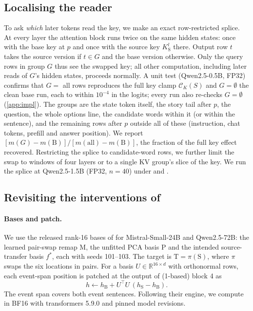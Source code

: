 \subsection{Localising the reader}\label{sec:method-splice}

To ask \emph{which} later tokens read the key, we make an exact row-restricted splice. At every layer the attention block runs twice on the same hidden states: once with the base key at $p$ and once with the source key $K_{\mathrm{S}}^l$ there. Output row $t$ takes the source version if $t \in G$ and the base version otherwise. Only the query rows in group $G$ thus see the swapped key; all other computation, including later reads of $G$'s hidden states, proceeds normally.
A unit test (Qwen2.5-0.5B, FP32) confirms that $G = $ all rows reproduces the full key clamp $\mathcal{C}_K(S)$ and $G = \emptyset$ the clean base run, each to within $10^{-4}$ in the logits; every run also re-checks $G = \emptyset$ (\cref{app:impl}).
The groups are the state token itself, the story tail after $p$, the question, the whole options line, the candidate words within it (or within the \fmtPost{} sentence), and the remaining rows after $p$ outside all of these (instruction, chat tokens, prefill and answer position). We report $[m(G) - m(\mathrm{B})]/[m(\text{all}) - m(\mathrm{B})]$, the fraction of the full key effect recovered. Restricting the splice to candidate-word rows, we further limit the swap to windows of four layers or to a single KV group's slice of the key.
We run the splice at Qwen2.5-1.5B (FP32, $n = 40$) under \fmtOpt{} and \fmtLetter{}. 

\subsection{Revisiting the interventions of \citet{anonymous2026fitted}}\label{sec:method-paper1}

\paragraph{Bases and patch.} We use the released rank-16 bases of \citet{anonymous2026fitted} for Mistral-Small-24B and Qwen2.5-72B: the learned pair-swap remap M, the unfitted PCA basis P and the intended source-transfer basis $f^*$, each with seeds 101--103. The target is $\mathrm{T} = \pi(\mathrm{S})$, where $\pi$ swaps the six locations in pairs. For a basis $U \in \mathbb{R}^{16 \times d}$ with orthonormal rows, each event-span position is patched at the output of (1-based) block 4 as
\begin{equation}\label{eq:patch}
h \leftarrow h_{\mathrm{B}} + U^{\top} U\,(h_{\mathrm{S}} - h_{\mathrm{B}}).
\end{equation}
The event span covers both event sentences. Following their engine, we compute in BF16 with transformers 5.9.0 and pinned model revisions.


